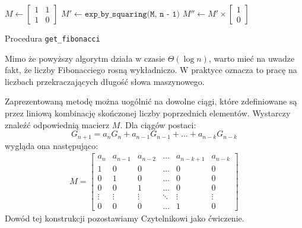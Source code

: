 \begin{algorithm}[h]
  \DontPrintSemicolon



  $M \leftarrow \begin{bmatrix}
                  1 & 1 \\
                  1 & 0
                \end{bmatrix}$\;
  $M' \leftarrow \texttt{exp\_by\_squaring(M, n - 1)}$\;
  $M'' \leftarrow M' \times \begin{bmatrix}1 \\ 0\end{bmatrix}$\;
  \;

  \caption{Procedura \texttt{get\_fibonacci}}
\end{algorithm}
Mimo że powyższy algorytm działa w czasie $\Theta(\log{n})$, warto mieć na uwadze fakt, że liczby Fibonacciego 
rosną wykładniczo. W praktyce oznacza to pracę na liczbach przekraczających długość słowa maszynowego.

Zaprezentowaną metodę można uogólnić na dowolne ciągi, które zdefiniowane są przez liniową 
kombinację skończonej liczby poprzednich elementów. Wystarczy znaleźć odpowiednią macierz $M$. 
Dla ciągów postaci:
\begin{equation*}
  G_{n + 1} = a_n G_n + a_{n - 1} G_{n - 1} + ... + a_{n - k} G_{n - k}
\end{equation*}
wygląda ona następująco:
\begin{align*}
  M
  =
  \begin{bmatrix}
    a_n    & a_{n - 1} & a_{n - 2} & \dots  & a_{n - k + 1} & a_{n - k} \\
    1      & 0         & 0         & \dots  & 0             & 0 \\
    0      & 1         & 0         & \dots  & 0             & 0 \\
    0      & 0         & 1         & \dots  & 0             & 0 \\
    \vdots & \vdots    & \vdots    & \ddots & \vdots        & \vdots \\
    0      & 0         & 0         & \dots  & 1             & 0
  \end{bmatrix}
\end{align*}
Dowód tej konstrukcji pozostawiamy Czytelnikowi jako ćwiczenie.

